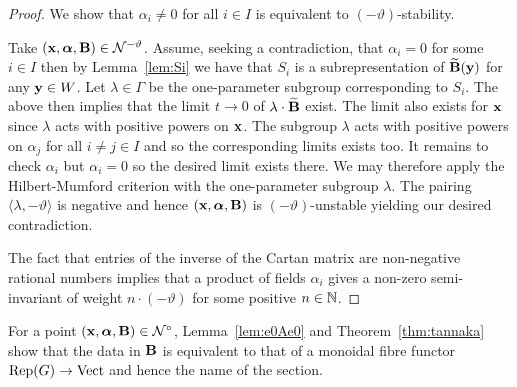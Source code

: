 \documentclass{amsart}
\newcommand{\balpha}{\boldsymbol{\alpha}}
\theoremstyle{definition}
\begin{document}
\begin{proof}
We show that $\alpha_i \neq 0$ for all $i \in I$ is equivalent to $(-\vartheta)$-stability.

Take $(\bfx, \balpha, \bfB) \in \cN^{-\vartheta}$. 
Assume, seeking a contradiction, that $\alpha_i =0$ for some $i \in I$ then by Lemma~\ref{lem:Si} we have that $S_i$ is a subrepresentation of $\widetilde{\mathbf{B}}(\mathbf{y})$ for any $\mathbf{y} \in W$.
Let $\lambda \in \Gamma$ be the one-parameter subgroup corresponding to $S_i$.
The above then implies that the limit $t \rightarrow 0$ of $\lambda \cdot \widetilde{\mathbf{B}}$ exist.
The limit also exists for $\mathbf{x}$ since $\lambda$ acts with positive powers on $\mathbf{x}$.
The subgroup $\lambda$ acts with positive powers on $\alpha_j$ for all $i\neq j\in I$ and so the corresponding limits exists too.
It remains to check $\alpha_i$ but $\alpha_i=0$ so the desired limit exists there.
We may therefore apply the Hilbert-Mumford criterion with the one-parameter subgroup $\lambda$.
The pairing $\langle \lambda, -\vartheta \rangle$ is negative and hence $(\bfx, \balpha, \bfB)$ is $(-\vartheta)$-unstable yielding our desired contradiction.

The fact that entries of the inverse of the Cartan matrix are non-negative rational numbers implies that a product of fields $\alpha_i$ gives a non-zero semi-invariant of weight $n\cdot (-\vartheta)$ for some positive $n \in \mathbb{N}$.
\end{proof}

\begin{remark}
For a point $(\bfx, \balpha, \bfB) \in \cN^\circ$, Lemma~\ref{lem:e0Ae0} and Theorem~\ref{thm:tannaka} show that the data in $\mathbf{B}$ is equivalent to that of a monoidal fibre functor $\operatorname{Rep}(G) \rightarrow \operatorname{Vect}$ and hence the name of the section.
\end{remark}
\end{document}
